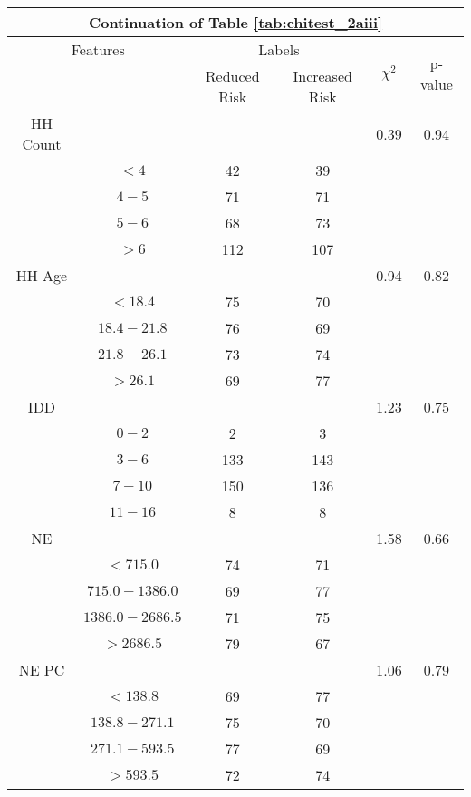 \begin{table}
\centering
\label{tab:chitest_2aiii_cont}
\begin{tabular}{c c | c c| c | c}
\hline
\multicolumn{6}{c}{Continuation of Table \ref{tab:chitest_2aiii}}\\ 
\hline
\multicolumn{2}{c|}{Features}& \multicolumn{2}{c|}{Labels}& \multirow{2}{*}{$\chi^2$} & \multirow{2}{*}{p-value}\\ 
& & Reduced Risk & Increased Risk & & \\ 
\hline
HH Count &  &  & & 0.39 & 0.94 \\ 
& $< 4$ & 42 & 39& & \\ 
& $4-5$ & 71 & 71& & \\ 
& $5-6$ & 68 & 73& & \\ 
& $> 6$ & 112 & 107& & \\ 
\hline 
HH Age &  &  & & 0.94 & 0.82 \\ 
& $< 18.4$ & 75 & 70& & \\ 
& $18.4-21.8$ & 76 & 69& & \\ 
& $21.8-26.1$ & 73 & 74& & \\ 
& $> 26.1$ & 69 & 77& & \\ 
\hline 
IDD &  &  & & 1.23 & 0.75 \\ 
& $0-2$ & 2 & 3& & \\ 
& $3-6$ & 133 & 143& & \\ 
& $7-10$ & 150 & 136& & \\ 
& $11-16$ & 8 & 8& & \\ 
\hline 
NE &  &  & & 1.58 & 0.66 \\ 
& $< 715.0$ & 74 & 71& & \\ 
& $715.0-1386.0$ & 69 & 77& & \\ 
& $1386.0-2686.5$ & 71 & 75& & \\ 
& $> 2686.5$ & 79 & 67& & \\ 
\hline 
NE PC &  &  & & 1.06 & 0.79 \\ 
& $< 138.8$ & 69 & 77& & \\ 
& $138.8-271.1$ & 75 & 70& & \\ 
& $271.1-593.5$ & 77 & 69& & \\ 
& $> 593.5$ & 72 & 74& & \\ 
\hline 
\end{tabular}
\end{table}

